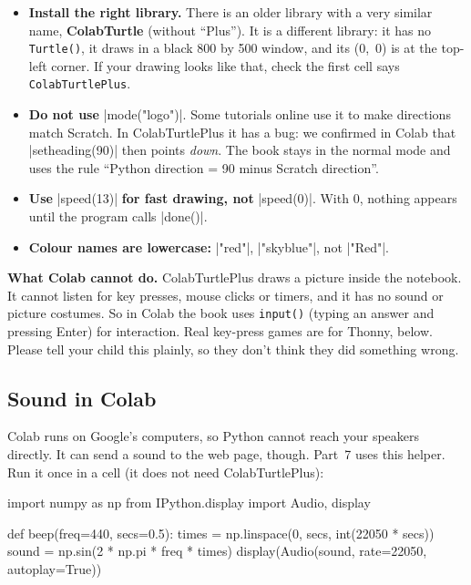 \begin{watchout}
\begin{itemize}[leftmargin=*]
  \item \textbf{Install the right library.} There is an older library with a very similar name, \textbf{ColabTurtle} (without ``Plus''). It is a different library: it has no \texttt{Turtle()}, it draws in a black 800 by 500 window, and its (0,~0) is at the top-left corner. If your drawing looks like that, check the first cell says \texttt{ColabTurtlePlus}.
  \item \textbf{Do not use} \py|mode("logo")|. Some tutorials online use it to make directions match Scratch. In ColabTurtlePlus it has a bug: we confirmed in Colab that \py|setheading(90)| then points \emph{down}. The book stays in the normal mode and uses the rule ``Python direction = 90 minus Scratch direction''.
  \item \textbf{Use} \py|speed(13)| \textbf{for fast drawing, not} \py|speed(0)|. With 0, nothing appears until the program calls \py|done()|.
  \item \textbf{Colour names are lowercase:} \py|"red"|, \py|"skyblue"|, not \py|"Red"|.
\end{itemize}
\end{watchout}

\textbf{What Colab cannot do.} ColabTurtlePlus draws a picture inside the notebook. It cannot listen for key presses, mouse clicks or timers, and it has no sound or picture costumes. So in Colab the book uses \texttt{input()} (typing an answer and pressing Enter) for interaction. Real key-press games are for Thonny, below. Please tell your child this plainly, so they don't think they did something wrong.

\subsection*{Sound in Colab}

Colab runs on Google's computers, so Python cannot reach your speakers directly. It can send a sound to the web page, though. Part~7 uses this helper. Run it once in a cell (it does not need ColabTurtlePlus):

\begin{code}
import numpy as np
from IPython.display import Audio, display

def beep(freq=440, secs=0.5):
    times = np.linspace(0, secs, int(22050 * secs))
    sound = np.sin(2 * np.pi * freq * times)
    display(Audio(sound, rate=22050, autoplay=True))
\end{code}

